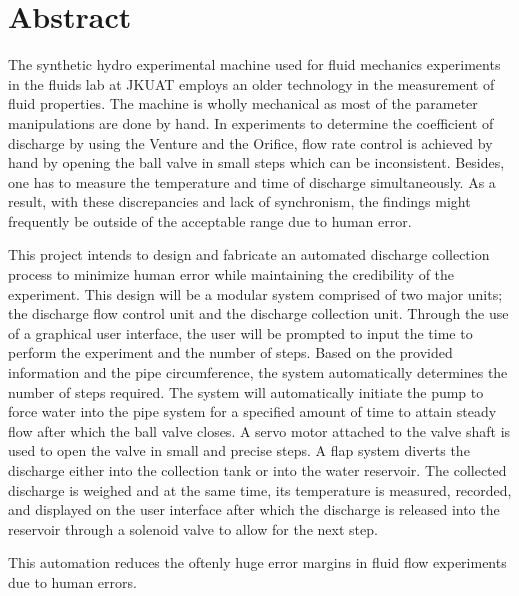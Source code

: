 \section*{Abstract}
\label{sec:}
\par
The synthetic hydro experimental machine used for fluid mechanics experiments in the fluids lab at JKUAT employs an older technology in the measurement of fluid properties. The machine is wholly mechanical as most of the parameter manipulations are done by hand. In experiments to determine the coefficient of discharge by using the Venture and the Orifice, flow rate control is achieved by hand by opening the ball valve in small steps which can be inconsistent. Besides, one has to measure the temperature and time of discharge simultaneously. As a result, with these discrepancies and lack of synchronism, the findings might frequently be outside of the acceptable range due to human error.
\par
This project intends to design and fabricate an automated discharge collection process to minimize human error while maintaining the credibility of the experiment. This design will be a modular system comprised of two major units; the discharge flow control unit and the discharge collection unit. Through the use of a graphical user interface, the user will be prompted to input the time to perform the experiment and the number of steps. Based on the provided information and the pipe circumference, the system automatically determines the number of steps required. The system will automatically initiate the pump to force water into the pipe system for a specified amount of time to attain steady flow after which the ball valve closes. A servo motor attached to the valve shaft is used to open the valve in small and precise steps. A flap system diverts the discharge either into the collection tank or into the water reservoir. The collected discharge is weighed and at the same time, its temperature is measured, recorded, and displayed on the user interface after which the discharge is released into the reservoir through a solenoid valve to allow for the next step.
\par
This automation reduces the oftenly huge error margins in fluid flow experiments due to human errors.